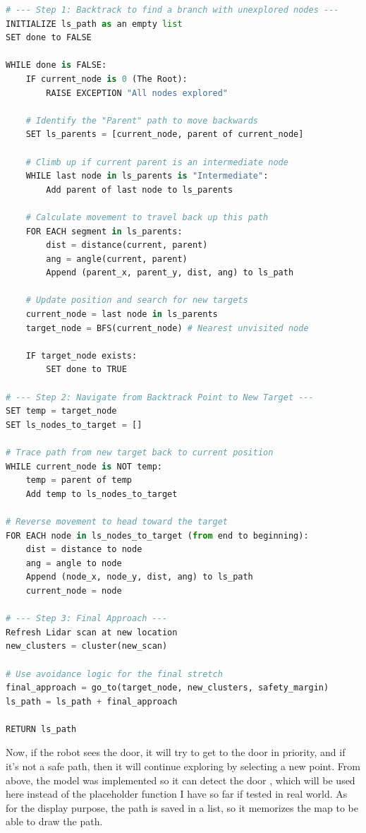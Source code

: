 \documentclass{article}
\begin{document}
\begin{lstlisting}[language=Python, caption=Robot Backtracking and Re-exploration Logic]
# --- Step 1: Backtrack to find a branch with unexplored nodes ---
INITIALIZE ls_path as an empty list
SET done to FALSE

WHILE done is FALSE:
    IF current_node is 0 (The Root):
        RAISE EXCEPTION "All nodes explored"

    # Identify the "Parent" path to move backwards
    SET ls_parents = [current_node, parent of current_node]
    
    # Climb up if current parent is an intermediate node
    WHILE last node in ls_parents is "Intermediate":
        Add parent of last node to ls_parents

    # Calculate movement to travel back up this path
    FOR EACH segment in ls_parents:
        dist = distance(current, parent)
        ang = angle(current, parent)
        Append (parent_x, parent_y, dist, ang) to ls_path

    # Update position and search for new targets
    current_node = last node in ls_parents
    target_node = BFS(current_node) # Nearest unvisited node

    IF target_node exists:
        SET done to TRUE

# --- Step 2: Navigate from Backtrack Point to New Target ---
SET temp = target_node
SET ls_nodes_to_target = []

# Trace path from new target back to current position
WHILE current_node is NOT temp:
    temp = parent of temp
    Add temp to ls_nodes_to_target

# Reverse movement to head toward the target
FOR EACH node in ls_nodes_to_target (from end to beginning):
    dist = distance to node
    ang = angle to node
    Append (node_x, node_y, dist, ang) to ls_path
    current_node = node

# --- Step 3: Final Approach ---
Refresh Lidar scan at new location
new_clusters = cluster(new_scan)

# Use avoidance logic for the final stretch
final_approach = go_to(target_node, new_clusters, safety_margin)
ls_path = ls_path + final_approach

RETURN ls_path
\end{lstlisting}

Now, if the robot sees the door, it will try to get to the door in priority, and if it's not a safe path, then it will continue exploring by selecting a new point. From above, the model was implemented so it can detect the door , which will be used here instead of the placeholder function I have so far if tested in real world. As for the display purpose, the path is saved in a list, so it memorizes the map to be able to draw the path. \\
\end{document}
